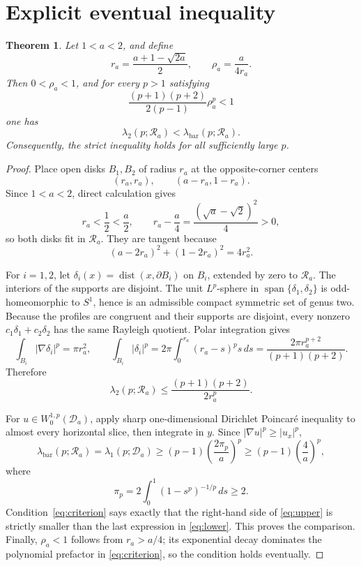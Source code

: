 \documentclass[11pt]{article}
\newtheorem{theorem}{Theorem}
\newcommand{\Ra}{\mathcal R_a}
\newcommand{\Da}{\mathcal D_a}
\newcommand{\lbar}{\lambda_{\mathrm{bar}}}
\begin{document}
\section{Explicit eventual inequality}

\begin{theorem}\label{thm:main}
Let \(1<a<2\), and define
\[
 r_a=\frac{a+1-\sqrt{2a}}2,
 \qquad \rho_a=\frac{a}{4r_a}.
\]
Then \(0<\rho_a<1\), and for every \(p>1\) satisfying
\begin{equation}\label{eq:criterion}
 \frac{(p+1)(p+2)}{2(p-1)}\rho_a^p<1
\end{equation}
one has
\[
 \lambda_2(p;\Ra)<\lbar(p;\Ra).
\]
Consequently, the strict inequality holds for all sufficiently large \(p\).
\end{theorem}

\begin{proof}
Place open disks \(B_1,B_2\) of radius \(r_a\) at the opposite-corner
centers
\[
 (r_a,r_a),\qquad (a-r_a,1-r_a).
\]
Since \(1<a<2\), direct calculation gives
\[
 r_a<\frac12<\frac a2,
 \qquad
 r_a-\frac a4=\frac{(\sqrt a-\sqrt2)^2}{4}>0,
\]
so both disks fit in \(\Ra\). They are tangent because
\[
 (a-2r_a)^2+(1-2r_a)^2=4r_a^2.
\]

For \(i=1,2\), let
\(\delta_i(x)=\operatorname{dist}(x,\partial B_i)\) on \(B_i\), extended
by zero to \(\Ra\). The interiors of the supports are disjoint. The unit
\(L^p\)-sphere in \(\operatorname{span}\{\delta_1,\delta_2\}\) is
odd-homeomorphic to \(S^1\), hence is an admissible compact symmetric set of
genus two. Because the profiles are congruent and their supports are
disjoint, every nonzero \(c_1\delta_1+c_2\delta_2\) has the same Rayleigh
quotient. Polar integration gives
\[
 \int_{B_i}|\nabla\delta_i|^p=\pi r_a^2,
 \qquad
 \int_{B_i}|\delta_i|^p
 =2\pi\int_0^{r_a}(r_a-s)^p s\,ds
 =\frac{2\pi r_a^{p+2}}{(p+1)(p+2)}.
\]
Therefore
\begin{equation}\label{eq:upper}
 \lambda_2(p;\Ra)
 \le \frac{(p+1)(p+2)}{2r_a^p}.
\end{equation}

For \(u\in W^{1,p}_0(\Da)\), apply sharp one-dimensional Dirichlet
Poincar\'e inequality to almost every horizontal slice, then integrate in
\(y\). Since \(|\nabla u|^p\ge |u_x|^p\),
\begin{equation}\label{eq:lower}
 \lbar(p;\Ra)=\lambda_1(p;\Da)
 \ge (p-1)\left(\frac{2\pi_p}{a}\right)^p
 \ge (p-1)\left(\frac4a\right)^p,
\end{equation}
where
\[
 \pi_p=2\int_0^1(1-s^p)^{-1/p}\,ds\ge2.
\]
Condition~\eqref{eq:criterion} says exactly that the right-hand side of
\eqref{eq:upper} is strictly smaller than the last expression in
\eqref{eq:lower}. This proves the comparison. Finally,
\(\rho_a<1\) follows from \(r_a>a/4\); its exponential decay dominates the
polynomial prefactor in \eqref{eq:criterion}, so the condition holds
eventually.
\end{proof}
\end{document}
